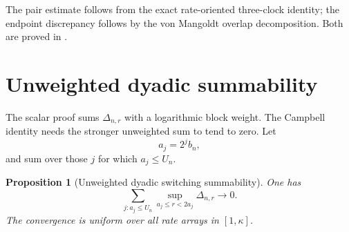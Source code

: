 \documentclass[11pt]{article}
\newtheorem{proposition}[theorem]{Proposition}
\theoremstyle{definition}
\theoremstyle{remark}
\begin{document}
The pair estimate follows from the exact rate-oriented three-clock identity;
the endpoint discrepancy follows by the von Mangoldt overlap decomposition.
Both are proved in \cite{LongOrder2026}.

\section{Unweighted dyadic summability}

The scalar proof sums $\Delta_{n,r}$ with a logarithmic block weight.  The
Campbell identity needs the stronger unweighted sum to tend to zero.
Let
\begin{equation}\label{eq:dyadic-aj}
 a_j=2^jb_n,
\end{equation}
and sum over those $j$ for which $a_j\le U_n$.

\begin{proposition}[Unweighted dyadic switching summability]
\label{prop:unweighted}
One has
\begin{equation}\label{eq:unweighted}
 \boxed{
 \sum_{j:a_j\le U_n}
 \sup_{a_j\le r<2a_j}\Delta_{n,r}
 \longrightarrow0.}
\end{equation}
The convergence is uniform over all rate arrays in $[1,\kappa]$.
\end{proposition}
\end{document}
